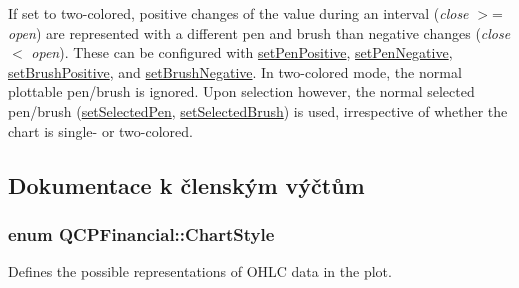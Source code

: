 If set to two-\/colored, positive changes of the value during an interval ({\itshape close} $>$= {\itshape open}) are represented with a different pen and brush than negative changes ({\itshape close} $<$ {\itshape open}). These can be configured with \hyperlink{classQCPFinancial_ac58aa3adc7a35aab0088764b840683e5}{set\+Pen\+Positive}, \hyperlink{classQCPFinancial_afe5c07e94ccea01a75b3a2476993c346}{set\+Pen\+Negative}, \hyperlink{classQCPFinancial_a5ebff2b1764efd07cc44942e67821829}{set\+Brush\+Positive}, and \hyperlink{classQCPFinancial_a8bbdd87629f9144b3ef51af660c0961a}{set\+Brush\+Negative}. In two-\/colored mode, the normal plottable pen/brush is ignored. Upon selection however, the normal selected pen/brush (\hyperlink{classQCPAbstractPlottable_a6911603cad23ab0469b108224517516f}{set\+Selected\+Pen}, \hyperlink{classQCPAbstractPlottable_ae8c816874089f7a44001e8618e81a9dc}{set\+Selected\+Brush}) is used, irrespective of whether the chart is single-\/ or two-\/colored. 

\subsection{Dokumentace k členským výčtům}
\hypertarget{classQCPFinancial_a0f800e21ee98d646dfc6f8f89d10ebfb}{}
\subsubsection[{Chart\+Style}]{\setlength{\rightskip}{0pt plus 5cm}enum {\bf Q\+C\+P\+Financial\+::\+Chart\+Style}}\label{classQCPFinancial_a0f800e21ee98d646dfc6f8f89d10ebfb}


Defines the possible representations of O\+H\+L\+C data in the plot. 

